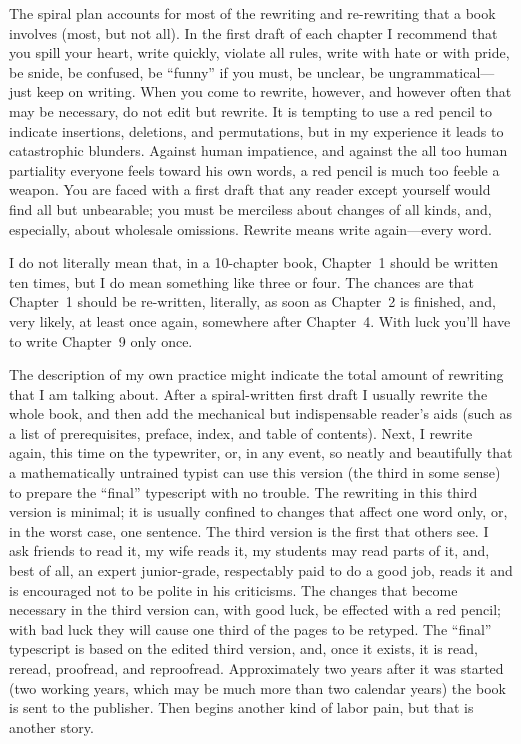 \documentclass[12pt]{article}
\begin{document}
The spiral plan accounts for most of the rewriting and re-rewriting that a book involves (most, but not all). In the first draft of each chapter I recommend that you spill your heart, write quickly, violate all rules, write with hate or with pride, be snide, be confused, be ``funny'' if you must, be unclear, be ungrammatical---just keep on writing. When you come to rewrite, however, and however often that may be necessary, do not edit but rewrite. It is tempting to use a red pencil to indicate insertions, deletions, and permutations, but in my experience it leads to catastrophic blunders. Against human impatience, and against the all too human partiality everyone feels toward his own words, a red pencil is much too feeble a weapon. You are faced with a first draft that any reader except yourself would find all but unbearable; you must be merciless about changes of all kinds, and, especially, about wholesale omissions. Rewrite means write again---every word. 

I do not literally mean that, in a 10-chapter book, Chapter~1 should be written ten times, but I do mean something like three or four. The chances are that Chapter~1 should be re-written, literally, as soon as Chapter~2 is finished, and, very likely, at least once again, somewhere after Chapter~4. With luck you'll have to write Chapter~9 only once. 

The description of my own practice might indicate the total amount of rewriting that I am talking about. After a spiral-written first draft I usually rewrite the whole book, and then add the mechanical but indispensable reader's aids (such as a list of prerequisites, preface, index, and table of contents). Next, I rewrite again, this time on the typewriter, or, in any event, so neatly and beautifully that a mathematically untrained typist can use this version (the third in some sense) to prepare the ``final'' typescript with no trouble. The rewriting in this third version is minimal; it is usually confined to changes that affect one word only, or, in the worst case, one sentence. The third version is the first that others see. I ask friends to read it, my wife reads it, my students may read parts of it, and, best of all, an expert junior-grade, respectably paid to do a good job, reads it and is encouraged not to be polite in his criticisms. The changes that become necessary in the third version can, with good luck, be effected with a red pencil; with bad luck they will cause one third of the pages to be retyped. The ``final'' typescript is based on the edited third version, and, once it exists, it is read, reread, proofread, and reproofread. Approximately two years after it was started (two working years, which may be much more than two calendar years) the book is sent to the publisher. Then begins another kind of labor pain, but that is another story. 
\end{document}
